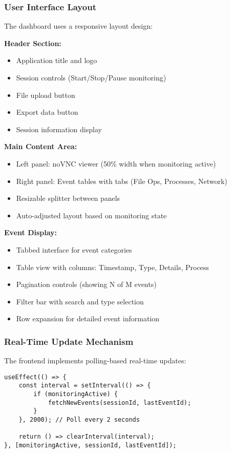\subsubsection{User Interface Layout}

The dashboard uses a responsive layout design:

\textbf{Header Section:}
\begin{itemize}
    \item Application title and logo
    \item Session controls (Start/Stop/Pause monitoring)
    \item File upload button
    \item Export data button
    \item Session information display
\end{itemize}

\textbf{Main Content Area:}
\begin{itemize}
    \item Left panel: noVNC viewer (50\% width when monitoring active)
    \item Right panel: Event tables with tabs (File Ops, Processes, Network)
    \item Resizable splitter between panels
    \item Auto-adjusted layout based on monitoring state
\end{itemize}

\textbf{Event Display:}
\begin{itemize}
    \item Tabbed interface for event categories
    \item Table view with columns: Timestamp, Type, Details, Process
    \item Pagination controls (showing N of M events)
    \item Filter bar with search and type selection
    \item Row expansion for detailed event information
\end{itemize}

\subsubsection{Real-Time Update Mechanism}

The frontend implements polling-based real-time updates:

\begin{verbatim}
useEffect(() => {
    const interval = setInterval(() => {
        if (monitoringActive) {
            fetchNewEvents(sessionId, lastEventId);
        }
    }, 2000); // Poll every 2 seconds
    
    return () => clearInterval(interval);
}, [monitoringActive, sessionId, lastEventId]);
\end{verbatim}

